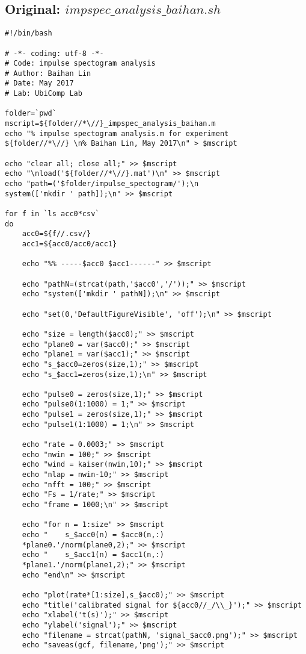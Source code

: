 \documentclass{sigchi}
\begin{document}
\subsection{Original: $impspec\_analysis\_baihan.sh$}\label{ss:imospc_ana.sh}
\begin{lstlisting}
#!/bin/bash

# -*- coding: utf-8 -*-
# Code: impulse spectogram analysis
# Author: Baihan Lin
# Date: May 2017
# Lab: UbiComp Lab

folder=`pwd`
mscript=${folder//*\//}_impspec_analysis_baihan.m
echo "% impulse spectogram analysis.m for experiment 
${folder//*\//} \n% Baihan Lin, May 2017\n" > $mscript

echo "clear all; close all;" >> $mscript
echo "\nload('${folder//*\//}.mat')\n" >> $mscript
echo "path=('$folder/impulse_spectogram/');\n
system(['mkdir ' path]);\n" >> $mscript

for f in `ls acc0*csv`
do
    acc0=${f//.csv/}
    acc1=${acc0/acc0/acc1}

	echo "%% -----$acc0 $acc1------" >> $mscript

	echo "pathN=(strcat(path,'$acc0','/'));" >> $mscript
	echo "system(['mkdir ' pathN]);\n" >> $mscript

	echo "set(0,'DefaultFigureVisible', 'off');\n" >> $mscript
	
	echo "size = length($acc0);" >> $mscript
	echo "plane0 = var($acc0);" >> $mscript
	echo "plane1 = var($acc1);" >> $mscript
	echo "s_$acc0=zeros(size,1);" >> $mscript
	echo "s_$acc1=zeros(size,1);\n" >> $mscript

	echo "pulse0 = zeros(size,1);" >> $mscript
	echo "pulse0(1:1000) = 1;" >> $mscript
	echo "pulse1 = zeros(size,1);" >> $mscript
	echo "pulse1(1:1000) = 1;\n" >> $mscript

	echo "rate = 0.0003;" >> $mscript
	echo "nwin = 100;" >> $mscript
	echo "wind = kaiser(nwin,10);" >> $mscript
	echo "nlap = nwin-10;" >> $mscript
	echo "nfft = 100;" >> $mscript
	echo "Fs = 1/rate;" >> $mscript
	echo "frame = 1000;\n" >> $mscript

	echo "for n = 1:size" >> $mscript
	echo "    s_$acc0(n) = $acc0(n,:)
    *plane0.'/norm(plane0,2);" >> $mscript
	echo "    s_$acc1(n) = $acc1(n,:)
    *plane1.'/norm(plane1,2);" >> $mscript
	echo "end\n" >> $mscript

	echo "plot(rate*[1:size],s_$acc0);" >> $mscript
	echo "title('calibrated signal for ${acc0//_/\\_}');" >> $mscript
	echo "xlabel('t(s)');" >> $mscript
	echo "ylabel('signal');" >> $mscript
	echo "filename = strcat(pathN, 'signal_$acc0.png');" >> $mscript
	echo "saveas(gcf, filename,'png');" >> $mscript


\end{lstlisting}
\end{document}
